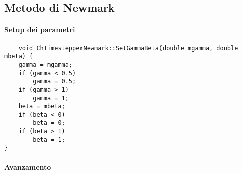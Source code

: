 \subsection{Metodo di Newmark}
\paragraph{Setup dei parametri}
\begin{verbatim}
    void ChTimestepperNewmark::SetGammaBeta(double mgamma, double mbeta) {
    gamma = mgamma;
    if (gamma < 0.5)
        gamma = 0.5;
    if (gamma > 1)
        gamma = 1;
    beta = mbeta;
    if (beta < 0)
        beta = 0;
    if (beta > 1)
        beta = 1;
}
\end{verbatim}

\paragraph{Avanzamento}


